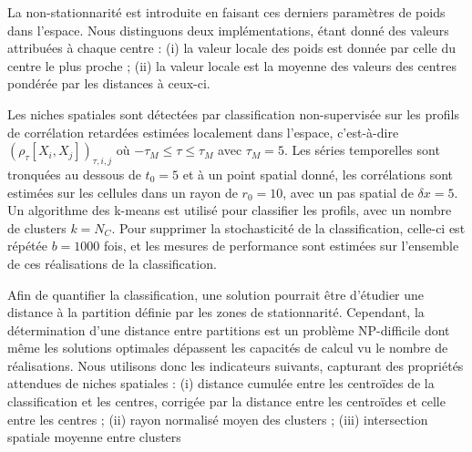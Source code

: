 \documentclass[11pt]{article}
\begin{document}

La non-stationnarité est introduite en faisant ces derniers paramètres de poids dans l'espace. Nous distinguons deux implémentations, étant donné des valeurs attribuées à chaque centre : (i) la valeur locale des poids est donnée par celle du centre le plus proche ; (ii) la valeur locale est la moyenne des valeurs des centres pondérée par les distances à ceux-ci.

Les niches spatiales sont détectées par classification non-supervisée sur les profils de corrélation retardées estimées localement dans l'espace, c'est-à-dire $(\rho_{\tau}\left[X_i,X_j\right])_{\tau,i,j}$ où $- \tau_M \leq \tau \leq  \tau_M$ avec $\tau_M = 5$. Les séries temporelles sont tronquées au dessous de $t_0 = 5$ et à un point spatial donné, les corrélations sont estimées sur les cellules dans un rayon de $r_0 = 10$, avec un pas spatial de $\delta x = 5$. Un algorithme des k-means est utilisé pour classifier les profils, avec un nombre de clusters $k = N_C$. Pour supprimer la stochasticité de la classification, celle-ci est répétée $b = 1000$ fois, et les mesures de performance sont estimées sur l'ensemble de ces réalisations de la classification.

Afin de quantifier la classification, une solution pourrait être d'étudier une distance à la partition définie par les zones de stationnarité. Cependant, la détermination d'une distance entre partitions est un problème NP-difficile \citep{day1981complexity} dont même les solutions optimales \citep{porumbel2011efficient} dépassent les capacités de calcul vu le nombre de réalisations. Nous utilisons donc les indicateurs suivants, capturant des propriétés attendues de niches spatiales : (i) distance cumulée entre les centroïdes de la classification et les centres, corrigée par la distance entre les centroïdes et celle entre les centres %
 ; (ii) rayon normalisé moyen des clusters ; (iii) intersection spatiale moyenne entre clusters
\end{document}
